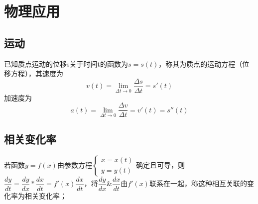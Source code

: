 
\chapter{物理应用}

\section{运动}
已知质点运动的位移s关于时间t的函数为\(s = s(t)\)，称其为质点的运动方程（位移方程），其速度为\[v(t) = \lim_{\Delta t \to 0}\dfrac{\Delta s}{\Delta t} = s'(t)\]
加速度为\[a(t) = \lim_{\Delta t \to 0}\dfrac{\Delta v}{\Delta t} = v'(t) = s''(t)\]

\section{相关变化率}
若函数\(y = f(x)\)由参数方程\(\begin{cases}
    x = x(t) \\ 
    y = y(t)
\end{cases}\)确定且可导，则\(\dfrac{dy}{dt} = \dfrac{dy}{dx} * \dfrac{dx}{dt} = f'(x)\dfrac{dx}{dt}\)，将\(\dfrac{dy}{dx} \&\dfrac{dx}{dt}\)由\(f'(x)\)联系在一起，称这种相互关联的变化率为相关变化率；
